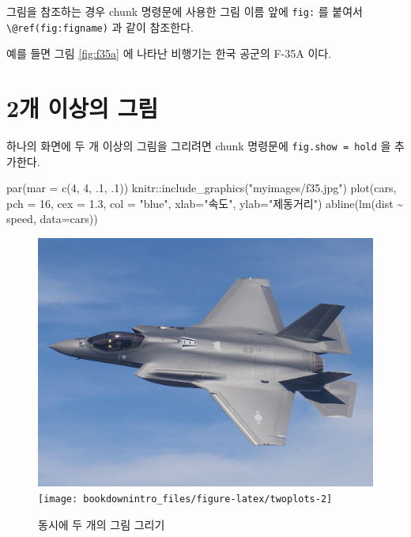 \documentclass[
]{book}
\newenvironment{Shaded}{\begin{snugshade}}{\end{snugshade}}
\newcommand{\AttributeTok}[1]{\textcolor[rgb]{0.77,0.63,0.00}{#1}}
\newcommand{\DecValTok}[1]{\textcolor[rgb]{0.00,0.00,0.81}{#1}}
\newcommand{\FloatTok}[1]{\textcolor[rgb]{0.00,0.00,0.81}{#1}}
\newcommand{\FunctionTok}[1]{\textcolor[rgb]{0.00,0.00,0.00}{#1}}
\newcommand{\NormalTok}[1]{#1}
\newcommand{\SpecialCharTok}[1]{\textcolor[rgb]{0.00,0.00,0.00}{#1}}
\newcommand{\StringTok}[1]{\textcolor[rgb]{0.31,0.60,0.02}{#1}}
\theoremstyle{definition}
\theoremstyle{definition}
\theoremstyle{definition}
\theoremstyle{definition}
\theoremstyle{remark}
\begin{document}
그림을 참조하는 경우 chunk 명령문에 사용한 그림 이름 앞에 \texttt{fig:} 를 붙여서 \texttt{\textbackslash{}@ref(fig:figname)} 과 같이 참조한다.

예를 들면 그림 \ref{fig:f35a} 에 나타난 비행기는 한국 공군의 F-35A 이다.

\hypertarget{uxac1c-uxc774uxc0c1uxc758-uxadf8uxb9bc}{%
\section{2개 이상의 그림}\label{uxac1c-uxc774uxc0c1uxc758-uxadf8uxb9bc}}

하나의 화면에 두 개 이상의 그림을 그리려면 chunk 명령문에 \texttt{fig.show\ =\ \textquotesingle{}hold\textquotesingle{}} 을 추가한다.

\begin{Shaded}
\begin{Highlighting}[]
\FunctionTok{par}\NormalTok{(}\AttributeTok{mar =} \FunctionTok{c}\NormalTok{(}\DecValTok{4}\NormalTok{, }\DecValTok{4}\NormalTok{, .}\DecValTok{1}\NormalTok{, .}\DecValTok{1}\NormalTok{))}
\NormalTok{knitr}\SpecialCharTok{::}\FunctionTok{include\_graphics}\NormalTok{(}\StringTok{"myimages/f35.jpg"}\NormalTok{)}
\FunctionTok{plot}\NormalTok{(cars, }\AttributeTok{pch =} \DecValTok{16}\NormalTok{, }\AttributeTok{cex =} \FloatTok{1.3}\NormalTok{, }\AttributeTok{col =} \StringTok{"blue"}\NormalTok{, }\AttributeTok{xlab=}\StringTok{"속도"}\NormalTok{, }\AttributeTok{ylab=}\StringTok{"제동거리"}\NormalTok{)}
\FunctionTok{abline}\NormalTok{(}\FunctionTok{lm}\NormalTok{(dist }\SpecialCharTok{\textasciitilde{}}\NormalTok{ speed, }\AttributeTok{data=}\NormalTok{cars))}
\end{Highlighting}
\end{Shaded}

\begin{figure}
\includegraphics[width=0.5\linewidth]{myimages/f35} \texttt{[image: bookdownintro\_files/figure-latex/twoplots-2]} \caption{동시에 두 개의 그림 그리기}\label{fig:twoplots}
\end{figure}
\end{document}

